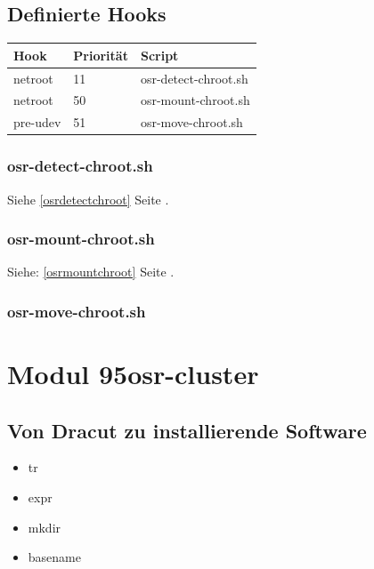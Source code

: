 \documentclass[10pt,a4paper]{article}
\begin{document}
\subsection{Definierte Hooks}

\begin{tabular}{|l|l|l|}
 \hline
\textbf{Hook} & \textbf{Priorität} & \textbf{Script} \\ \hline
netroot  & 11 & osr-detect-chroot.sh \\ \hline
netroot  & 50 & osr-mount-chroot.sh \\ \hline
pre-udev & 51 & osr-move-chroot.sh \\ \hline
\end{tabular}

\subsubsection{osr-detect-chroot.sh}

Siehe \ref{osrdetectchroot} Seite \pageref{osrdetectchroot}.

\subsubsection{osr-mount-chroot.sh}

Siehe: \ref{osrmountchroot} Seite \pageref{osrmountchroot}.

\subsubsection{osr-move-chroot.sh}




\section{Modul 95osr-cluster}

\subsection{Von Dracut zu installierende Software}

\begin{itemize}
 \item tr
 \item expr
 \item mkdir
 \item basename
\end{itemize}
\end{document}
